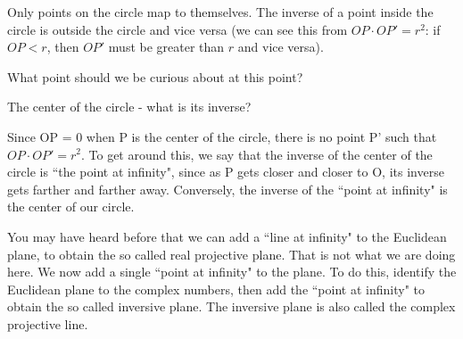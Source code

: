 


Only points on the circle map to themselves.  The inverse of a point inside the circle is outside the circle and vice versa (we can see this from $OP \cdot OP' = r^2$: if $OP < r$, then $OP'$ must be greater than $r$ and vice versa).

What point should we be curious about at this point?







The center of the circle - what is its inverse?



Since OP = 0 when P is the center of the circle, there is no point P' such that $OP \cdot OP' = r^2$.  To get around this, we say that the inverse of the center of the circle is ``the point at infinity", since as P gets closer and closer to O, its inverse gets farther and farther away.  Conversely, the inverse of the ``point at infinity" is the center of our circle.

You may have heard before that we can add a ``line at infinity" to the Euclidean plane, to obtain the so called real projective plane. That is not what we are doing here. We now add a single ``point at infinity" to the plane. To do this, identify the Euclidean plane to the complex numbers, then add the ``point at infinity" to obtain the so called inversive plane. The inversive plane is also called the complex projective line.

